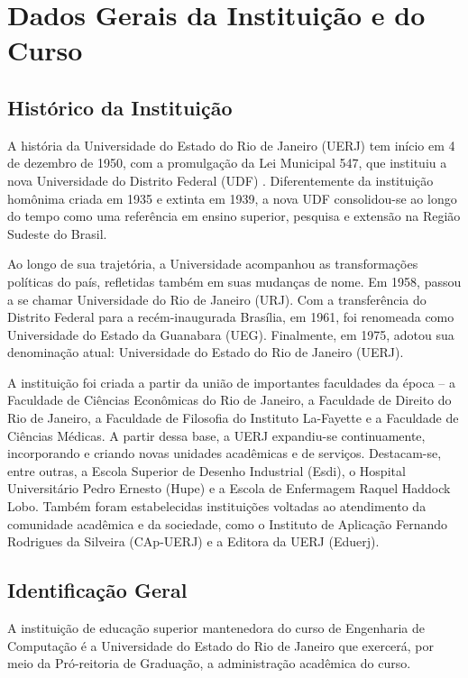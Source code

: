 \chapter{Dados Gerais da Instituição e do Curso}
\thispagestyle{plain}

\section{Histórico da Instituição}
\label{sec:historia}

A história da Universidade do Estado do Rio de Janeiro (UERJ) tem início em 4 de dezembro de 1950, com a promulgação da Lei Municipal  547, que instituiu a nova Universidade do Distrito Federal (UDF) \cite{lei5471950}. Diferentemente da instituição homônima criada em 1935 e extinta em 1939, a nova UDF consolidou-se ao longo do tempo como uma referência em ensino superior, pesquisa e extensão na Região Sudeste do Brasil.

Ao longo de sua trajetória, a Universidade acompanhou as transformações políticas do país, refletidas também em suas mudanças de nome. Em 1958, passou a se chamar Universidade do Rio de Janeiro (URJ). Com a transferência do Distrito Federal para a recém-inaugurada Brasília, em 1961, foi renomeada como Universidade do Estado da Guanabara (UEG). Finalmente, em 1975, adotou sua denominação atual: Universidade do Estado do Rio de Janeiro (UERJ).

A instituição foi criada a partir da união de importantes faculdades da época -- a Faculdade de Ciências Econômicas do Rio de Janeiro, a Faculdade de Direito do Rio de Janeiro, a Faculdade de Filosofia do Instituto La-Fayette e a Faculdade de Ciências Médicas. A partir dessa base, a UERJ expandiu-se continuamente, incorporando e criando novas unidades acadêmicas e de serviços. Destacam-se, entre outras, a Escola Superior de Desenho Industrial (Esdi), o Hospital Universitário Pedro Ernesto (Hupe) e a Escola de Enfermagem Raquel Haddock Lobo. Também foram estabelecidas instituições voltadas ao atendimento da comunidade acadêmica e da sociedade, como o Instituto de Aplicação Fernando Rodrigues da Silveira (CAp-UERJ) e a Editora da UERJ (Eduerj).


\section{Identificação Geral}

A instituição de educação superior mantenedora do curso de Engenharia de Computação é a Universidade do Estado do Rio de Janeiro que exercerá, por meio da Pró-reitoria de Graduação, a administração acadêmica do curso.

